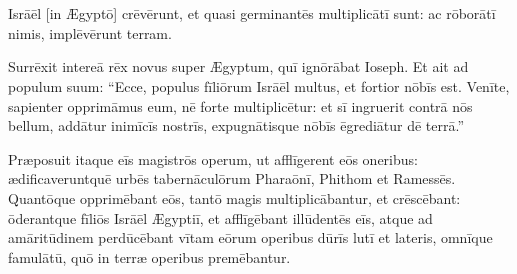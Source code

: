 \chapter{}


\thispagestyle{empty}


 Isrāēl [in Ægyptō] crēvērunt, et quasi germinantēs multiplicātī sunt:
ac rōborātī nimis, implēvērunt terram.

Surrēxit intereā rēx novus super Ægyptum, quī ignōrābat Ioseph.
Et ait ad populum suum: ``Ecce, populus fīliōrum Isrāēl multus, et fortior nōbīs est.
Venīte, sapien\-ter opprimāmus eum, nē forte multiplicētur: et sī ingruerit contrā nōs bellum, addātur inimīcīs nostrīs, expugnātisque nōbīs ēgrediātur dē terrā.''

Præposuit itaque eīs magistrōs operum, ut afflīgerent eōs oneribus: 
ædificaveruntquē urbēs tabernāculōrum Pharaōnī, Phithom et Ramessēs.
Quantōque opprimēbant eōs, tantō magis multiplicābantur, et crēscēbant: 
ōderantque fīliōs Isrāēl Ægyptiī, et afflīgēbant illūdentēs eīs,
atque ad amāritūdinem perdūcēbant vītam eōrum operibus dūrīs lutī et lateris, omnīque famulātū, quō in terræ operibus premēbantur. 

